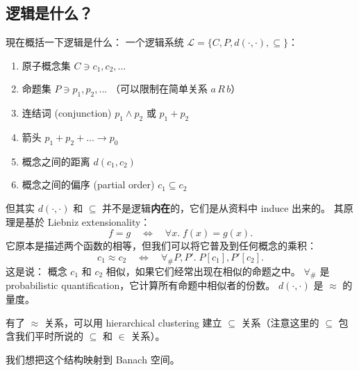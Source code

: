 \documentclass[12pt]{article}
\begin{document}
\subsection{逻辑是什么？}

現在概括一下逻辑是什么：  一个逻辑系统 $\mathcal{L} = \{ C, P, d(\cdot,\cdot), \subseteq \}$：
\begin{enumerate}
\item 原子概念集 $C \ni c_1, c_2, ...$
\item 命题集 $P \ni p_1, p_2, ...$ （可以限制在简单关系 $a\, R\, b$）
\item 连结词 (conjunction) $p_1 \wedge p_2$ 或 $p_1 + p_2$
\item 箭头 $p_1 + p_2 + ... \rightarrow p_0$
\item 概念之间的距离 $d(c_1, c_2)$
\item 概念之间的偏序 (partial order) $c_1 \subseteq c_2$
\end{enumerate}

但其实 $d(\cdot, \cdot)$ 和 $\subseteq$ 并不是逻辑\textbf{内在}的，它们是从资料中 induce 出来的。 其原理是基於 Liebniz extensionality：
$$ f = g \quad \Leftrightarrow \quad \forall x. \; f(x) = g(x). $$
它原本是描述两个函数的相等，但我们可以将它普及到任何概念的乘积：
$$ c_1 \approx c_2 \quad \Leftrightarrow \quad \forall_\# P, P'. \; P[c_1], P'[c_2]. $$
这是说： 概念 $c_1$ 和 $c_2$ 相似，如果它们经常出现在相似的命题之中。  $\forall_\#$ 是 probabilistic quantification，它计算所有命题中相似者的份数。  $d(\cdot, \cdot)$ 是 $\approx$ 的量度。

有了 $\approx$ 关系，可以用 hierarchical clustering 建立 $\subseteq$ 关系（注意这里的 $\subseteq$ 包含我们平时所说的 $\subseteq$ 和 $\in$ 关系）。

我们想把这个结构映射到 Banach 空间。
\end{document}
